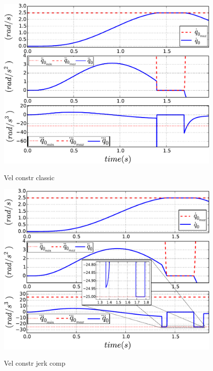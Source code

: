 \documentclass[a4paper, 10pt, conference]{ieeeconf}      %
\begin{document}
{{\newpage
\begin{figure}[!htbp]
\centering
{\includegraphics[width=1.0\columnwidth]{figures/0_Vel_constr_classic}}
\caption{Vel constr classic} 
\label{fig:0_Vel_constr_classic}
\end{figure}
\begin{figure}[!htbp]
\centering
{\includegraphics[width=1.0\columnwidth]{figures/1_Vel_constr_jerk_comp}}
\caption{Vel constr jerk comp} 
\label{fig:1_Vel_constr_jerk_comp}
\end{figure}
\begin{figure}[!htbp]
\centering

\end{figure}}}
\end{document}
